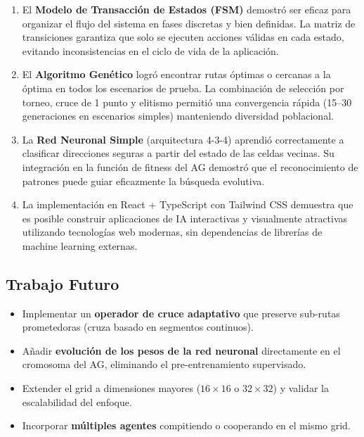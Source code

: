 \documentclass[12pt,a4paper]{article}
\begin{document}
\begin{enumerate}
  \item El \textbf{Modelo de Transacci\'on de Estados (FSM)} demostr\'o ser eficaz para organizar el flujo del sistema en fases discretas y bien definidas. La matriz de transiciones garantiza que solo se ejecuten acciones v\'alidas en cada estado, evitando inconsistencias en el ciclo de vida de la aplicaci\'on.

  \item El \textbf{Algoritmo Gen\'etico} logr\'o encontrar rutas \'optimas o cercanas a la \'optima en todos los escenarios de prueba. La combinaci\'on de selecci\'on por torneo, cruce de 1 punto y elitismo permiti\'o una convergencia r\'apida (15--30 generaciones en escenarios simples) manteniendo diversidad poblacional.

  \item La \textbf{Red Neuronal Simple} (arquitectura 4-3-4) aprendi\'o correctamente a clasificar direcciones seguras a partir del estado de las celdas vecinas. Su integraci\'on en la funci\'on de fitness del AG demostr\'o que el reconocimiento de patrones puede guiar eficazmente la b\'usqueda evolutiva.

  \item La implementaci\'on en React + TypeScript con Tailwind CSS demuestra que es posible construir aplicaciones de IA interactivas y visualmente atractivas utilizando tecnolog\'ias web modernas, sin dependencias de librer\'ias de machine learning externas.
\end{enumerate}

\subsection{Trabajo Futuro}

\begin{itemize}
  \item Implementar un \textbf{operador de cruce adaptativo} que preserve sub-rutas prometedoras (cruza basado en segmentos continuos).
  \item A\~nadir \textbf{evoluci\'on de los pesos de la red neuronal} directamente en el cromosoma del AG, eliminando el pre-entrenamiento supervisado.
  \item Extender el grid a dimensiones mayores ($16 \times 16$ o $32 \times 32$) y validar la escalabilidad del enfoque.
  \item Incorporar \textbf{m\'ultiples agentes} compitiendo o cooperando en el mismo grid.
\end{itemize}
\end{document}
